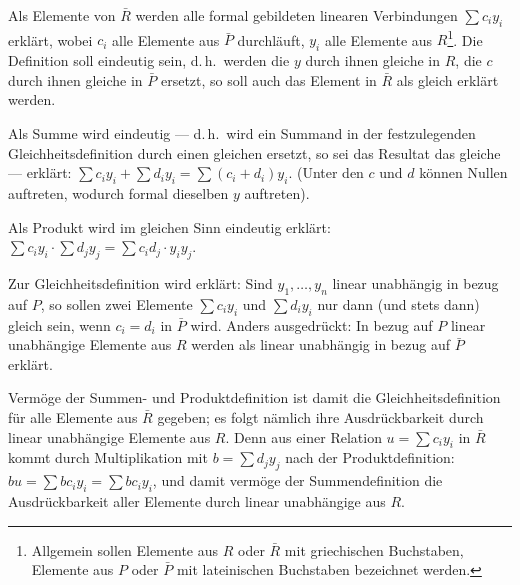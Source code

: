 \documentclass[12pt,a4paper]{article}
\theoremstyle{plain}
\theoremstyle{definition}
\theoremstyle{remark}
\begin{document}
Als Elemente von $\bar{R}$ werden alle formal gebildeten linearen Verbindungen $\sum c_{i}y_{i}$ erklärt, wobei $c_{i}$ alle Elemente aus $\bar{P}$ durchläuft, $y_{i}$ alle Elemente aus $R$\footnote{Allgemein sollen Elemente aus $R$ oder $\bar{R}$ mit griechischen Buchstaben, Elemente aus $P$ oder $\bar{P}$ mit lateinischen Buchstaben bezeichnet werden.}. Die Definition soll eindeutig sein, d.\,h.\ werden die $y$ durch ihnen gleiche in $R$, die $c$ durch ihnen gleiche in $\bar{P}$ ersetzt, so soll auch das Element in $\bar{R}$ als gleich erklärt werden.

Als Summe wird eindeutig --- d.\,h.\ wird ein Summand in der festzulegenden Gleichheitsdefinition durch einen gleichen ersetzt, so sei das Resultat das gleiche --- erklärt: $\sum c_{i}y_{i} + \sum d_{i}y_{i} = \sum (c_{i} + d_{i})y_{i}$. (Unter den $c$ und $d$ können Nullen auftreten, wodurch formal dieselben $y$ auftreten).

Als Produkt wird im gleichen Sinn eindeutig erklärt: $\sum c_{i}y_{i} \cdot \sum d_{j}y_{j} = \sum c_{i}d_{j} \cdot y_{i}y_{j}$.

Zur Gleichheitsdefinition wird erklärt: Sind $y_{1},\dots,y_{n}$ linear unabhängig in bezug auf $P$, so sollen zwei Elemente $\sum c_{i}y_{i}$ und $\sum d_{i}y_{i}$ nur dann (und stets dann) gleich sein, wenn $c_{i} = d_{i}$ in $\bar{P}$ wird. Anders ausgedrückt: In bezug auf $P$ linear unabhängige Elemente aus $R$ werden als linear unabhängig in bezug auf $\bar{P}$ erklärt.

Vermöge der Summen- und Produktdefinition ist damit die Gleichheitsdefinition für alle Elemente aus $\bar{R}$ gegeben; es folgt nämlich ihre Ausdrückbarkeit durch linear unabhängige Elemente aus $R$. Denn aus einer Relation $u = \sum c_{i}y_{i}$ in $\bar{R}$ kommt durch Multiplikation mit $b = \sum d_{j}y_{j}$ nach der Produktdefinition: $bu = \sum b c_{i} y_{i} = \sum b c_{i} y_{i}$, und damit vermöge der Summendefinition die Ausdrückbarkeit aller Elemente durch linear unabhängige aus $R$.
\end{document}
